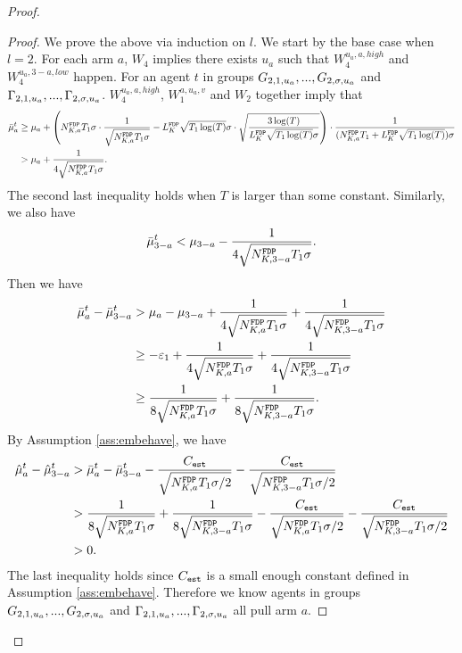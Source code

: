 \begin{proof}
\begin{proof}
We prove the above via induction on $l$. %
We start by the base case when $l=2$. For each arm $a$, $W_4$ implies there exists $u_a$ such that $W^{u_a,a,high}_4$ and $W^{u_a,3-a,low}_4$ happen. For an agent $t$  in groups $G_{2,1,u_a},...,G_{2,\NG,u_a}$ and $\Gamma_{2,1,u_a},...,\Gamma_{2,\NG,u_a}$.
$W_4^{u_a,a,high}$,  $W_1^{a,u_a,v}$ and $W_2$ together imply that
\begin{align*}
\bar{\mu}_a ^t &\geq \mu_a + \left(\fdpN T_1\NG \cdot \frac{1}{\sqrt{\fdpN T_1\NG}} - \GdT \sqrt{T_1\log(T)} \NG\cdot \sqrt{\frac{3\log(T)}{ \GdT \sqrt{T_1\log(T)}\NG}} \right) \cdot \frac{1}{(\fdpN T_1+ \GdT \sqrt{T_1\log(T)})\NG} \\
&> \mu_a + \frac{1}{4\sqrt{\fdpN T_1\NG}}.
\end{align*}
The second last inequality holds when $T$ is larger than some constant.
Similarly, we also have
\[
\bar{\mu}_{3-a}^t< \mu_{3-a}   - \frac{1}{4\sqrt{\fdpN[3-a] T_1\NG}}.
\]
Then we have
\begin{align*}
\bar{\mu}^t_a - \bar{\mu}^t_{3-a} &> \mu_a - \mu_{3-a} + \frac{1}{4\sqrt{\fdpN T_1\NG}} + \frac{1}{4\sqrt{\fdpN[3-a] T_1\NG}}\\
&\geq -\varepsilon_1+ \frac{1}{4\sqrt{\fdpN T_1\NG}} + \frac{1}{4\sqrt{\fdpN[3-a] T_1\NG}}\\
&\geq \frac{1}{8\sqrt{\fdpN T_1\NG}} + \frac{1}{8\sqrt{\fdpN[3-a] T_1\NG}}.
\end{align*}
By Assumption \ref{ass:embehave}, we have
\begin{align*}
\hat{\mu}_a^t - \hat{\mu}_{3-a}^t &> \bar{\mu}^t_a - \bar{\mu}^t_{3-a} -  \frac{\estC}{\sqrt{\fdpN T_1\NG/2}} - \frac{\estC}{\sqrt{\fdpN[3-a] T_1\NG/2}}\\
&> \frac{1}{8\sqrt{\fdpN T_1\NG}} + \frac{1}{8\sqrt{\fdpN[3-a] T_1\NG}} -   \frac{\estC}{\sqrt{\fdpN T_1\NG/2}} - \frac{\estC}{\sqrt{\fdpN[3-a] T_1\NG/2}}\\
&>0.
\end{align*}
The last inequality holds since $\estC$ is a small enough constant defined in Assumption \ref{ass:embehave}. Therefore we know agents in groups $G_{2,1,u_a},...,G_{2,\NG,u_a}$ and $\Gamma_{2,1,u_a},...,\Gamma_{2,\NG,u_a}$ all pull arm $a$.


\end{proof}
\end{proof}

